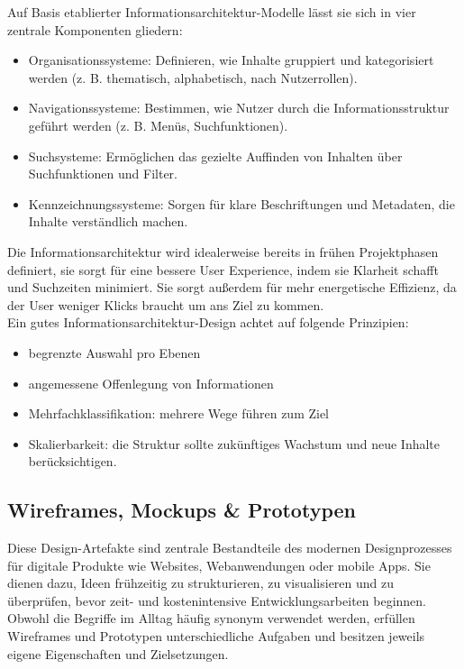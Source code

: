 Auf Basis etablierter Informationsarchitektur-Modelle lässt sie sich in vier 
zentrale Komponenten gliedern:\cite{b13_informationsarchitektur} \cite{eresult_informationsarchitektur}
\begin{itemize}
    \item Organisationssysteme: Definieren, wie Inhalte gruppiert und kategorisiert werden (z. B. thematisch, alphabetisch, nach Nutzerrollen).
    \item Navigationssysteme: Bestimmen, wie Nutzer durch die Informationsstruktur geführt werden (z. B. Menüs, Suchfunktionen).
    \item Suchsysteme: Ermöglichen das gezielte Auffinden von Inhalten über Suchfunktionen und Filter.
    \item Kennzeichnungssysteme: Sorgen für klare Beschriftungen und Metadaten, die Inhalte verständlich machen.
\end{itemize}
\vspace{0.5em}
Die Informationsarchitektur wird idealerweise bereits in frühen Projektphasen definiert, sie sorgt für eine
bessere User Experience, indem sie Klarheit schafft und Suchzeiten minimiert. Sie sorgt außerdem für mehr energetische Effizienz,
da der User weniger Klicks braucht um ans Ziel zu kommen.\cite{b13_informationsarchitektur} \cite{eresult_informationsarchitektur}\\

Ein gutes Informationsarchitektur-Design achtet auf folgende Prinzipien:\cite{b13_informationsarchitektur}\cite{eresult_informationsarchitektur}
\begin{itemize}
    \item begrenzte Auswahl pro Ebenen
    \item angemessene Offenlegung von Informationen
    \item Mehrfachklassifikation: mehrere Wege führen zum Ziel
    \item Skalierbarkeit: die Struktur sollte zukünftiges Wachstum und neue Inhalte berücksichtigen. 
\end{itemize}

\vspace{0.5em}

\subsection{Wireframes, Mockups \& Prototypen}

Diese Design-Artefakte sind zentrale Bestandteile des modernen Designprozesses für digitale Produkte wie Websites, 
Webanwendungen oder mobile Apps. Sie dienen dazu, Ideen frühzeitig zu strukturieren, zu visualisieren und zu überprüfen, 
bevor zeit- und kostenintensive Entwicklungsarbeiten beginnen. Obwohl die Begriffe im Alltag häufig synonym verwendet werden, 
erfüllen Wireframes und Prototypen unterschiedliche Aufgaben und besitzen jeweils eigene Eigenschaften und Zielsetzungen. \cite{popwebdesign_wire}\cite{justinmind_wireframe_prototyp_mockup}\cite{miro_wire}\\

